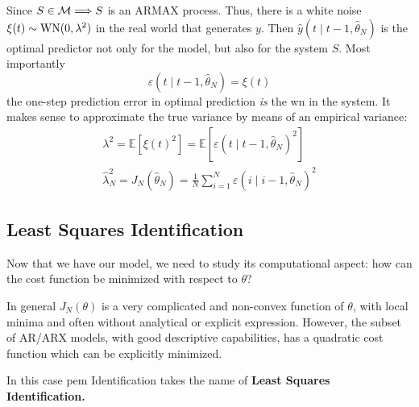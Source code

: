 Since $ S\in \mathcal{M} \Longrightarrow S$ is an ARMAX process. Thus, there is a white noise $ \xi (t) \sim \operatorname{WN}(0,\lambda ^{2})$ in the real world that generates $y$. Then $ \hat{y}(t\mid t-1,\hat{\theta }_{N})$ is the optimal predictor not only for the model, but also for the system $S$. Most importantly
\begin{equation*}
\varepsilon (t\mid t-1,\hat{\theta }_{N}) =\xi (t)
\end{equation*}
the one-step prediction error in optimal prediction \textit{is} the \gls{wn} in the system. It makes sense to approximate the true variance by means of an empirical variance:
\begin{gather*}
\lambda ^{2} =\mathbb{E}\left[ \xi (t)^{2}\right] =\mathbb{E}[ \varepsilon (t\mid t-1,\hat{\theta }_{N})^2]\\
\hat{\lambda }_{N}^{2} =J_{N}(\hat{\theta }_{N}) =\frac{1}{N}\sum _{i=1}^{N} \varepsilon (i\mid i-1,\hat{\theta }_{N})^{2}
\end{gather*}

\subsection{Least Squares Identification}
Now that we have our model, we need to study its computational aspect: how can the cost function be minimized with respect to $ \theta ?$

In general $ J_{N}(\theta)$ is a very complicated and non-convex function of $ \theta $, with local minima and often without analytical or explicit expression. However, the subset of AR/ARX models, with good descriptive capabilities, has a quadratic cost function which can be explicitly minimized.

In this case \gls{pem} Identification takes the name of \textbf{Least Squares Identification.}

